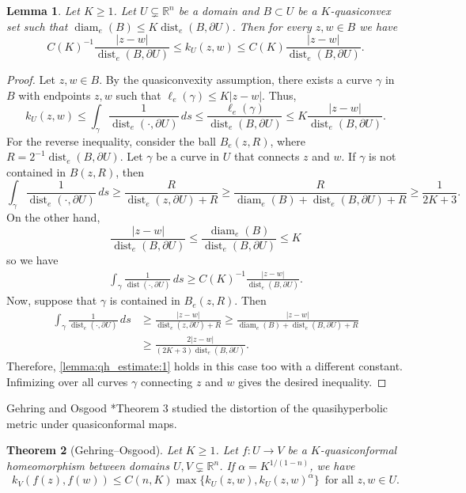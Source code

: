 \documentclass[letterpaper]{amsart}
\theoremstyle{plain}
\newtheorem{theorem}{Theorem}
\newtheorem{lemma}[theorem]{Lemma}
\theoremstyle{definition}
\theoremstyle{remark}
\numberwithin{equation}{section}
\numberwithin{theorem}{section}
\newcommand{\R}{\mathbb R}
\DeclareMathOperator{\dist}{dist}
\DeclareMathOperator{\diam}{diam}
\begin{document}
\begin{lemma}\label{lemma:qh_estimate}
Let $K\geq 1$. Let $U\subsetneq \R^n$ be a domain and $B\subset U$ be a $K$-quasiconvex set such that $\diam_e (B)\leq K{\dist_e (B,\partial U)}$. Then for every $z,w\in B$ we have
$$ C(K)^{-1} \frac{|z-w|}{\dist_e(B,\partial U)}\leq k_U(z,w) \leq C(K) \frac{|z-w|}{\dist_e(B,\partial U)}.$$
\end{lemma}
\begin{proof}
Let $z,w\in B$. By the quasiconvexity assumption, there exists a curve $\gamma$ in $B$ with endpoints $z,w$ such that $\ell_e(\gamma)\leq K |z-w|$. Thus, 
$$k_U(z,w) \leq \int_\gamma \frac{1}{\dist_e(\cdot,\partial U)}\, ds \leq \frac{\ell_e(\gamma)}{\dist_e(B,\partial U)} \leq K\frac{|z-w|}{\dist_e(B,\partial U)}.$$
For the reverse inequality, consider the ball $B_e(z,R)$, where $R=2^{-1}\dist_e(B,\partial U)$. Let $\gamma$ be a curve in $U$ that connects $z$ and $w$. If $\gamma$ is not contained in $B(z,R)$, then
$$\int_\gamma \frac{1}{\dist_e(\cdot,\partial U)} \, ds \geq \frac{R}{\dist_e(z,\partial U)+R} \geq \frac{R}{\diam_e (B)+\dist_e(B,\partial U)+R}\geq \frac{1}{2K+3}.$$ 
On the other hand, 
$$\frac{|z-w|}{\dist_e(B,\partial U)} \leq \frac{\diam_e(B)}{\dist_e(B,\partial U)}\leq K$$
so we have
\begin{align}\label{lemma:qh_estimate:1}
\int_\gamma \frac{1}{\dist(\cdot,\partial U)} \, ds \geq C(K)^{-1} \frac{|z-w|}{\dist_e(B,\partial U)}.
\end{align}
Now, suppose that $\gamma$ is contained in $B_e(z,R)$. Then
\begin{align*}
\int_\gamma \frac{1}{\dist_e(\cdot,\partial U)} \, ds &\geq  \frac{|z-w|}{\dist_e(z,\partial U)+R} \geq \frac{|z-w|}{\diam_e(B)+\dist_e (B,\partial U)+R}\\
&\geq \frac{2|z-w|}{(2K+3)\dist_e(B,\partial U)}.
\end{align*}
Therefore, \eqref{lemma:qh_estimate:1} holds in this case too with a different constant. Infimizing over all curves $\gamma$ connecting $z$ and $w$ gives the desired inequality.
\end{proof}

Gehring and Osgood \cite{GehringOsgood:uniform}*{Theorem 3} studied the distortion of the quasihyperbolic metric under quasiconformal maps.

\begin{theorem}[Gehring--Osgood]\label{theorem:gehring_osgood}
Let $K\geq 1$. Let $f\colon U\to V$ be a $K$-quasi\-con\-for\-mal homeomorphism between domains $U,V\subsetneq \R^n$. If $\alpha=K^{1/(1-n)}$, we have
$$k_{V}(f(z),f(w))\leq C(n,K) \max \{ k_U(z,w), k_U(z,w)^\alpha\}\,\,\, \text{for all $z,w\in U$}.$$
\end{theorem}
\end{document}
